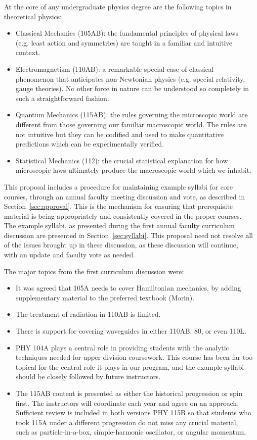 \documentclass[12pt]{article}
\begin{document}
At the core of any undergraduate physics degree are the following
topics in theoretical physics:
\begin{itemize}
\item Classical Mechanics (105AB): the fundamental principles of physical laws
  (e.g. least action and symmetries) are taught in a familiar and
  intuitive context. 
\item Electromagnetism (110AB): a remarkable special case of classical
  phenomenon that anticipates non-Newtonian physics (e.g. special
  relativity, gauge theories).  No other force in nature can be understood so
  completely in such a straightforward fashion.  
\item Quantum Mechanics (115AB): the rules governing the microscopic world are
  different from those governing our familiar macroscopic world.  The
  rules are not intuitive but they can be codified and used to make
  quantitative predictions which can be experimentally verified.
\item Statistical Mechanics (112): the crucial statistical explanation for how
  microscopic laws ultimately produce the macroscopic world which we inhabit.
\end{itemize}

This proposal includes a procedure for maintaining example syllabi for
core courses, through an annual faculty meeting discussion and vote,
as described in Section~\ref{sec:approval}.  This is the mechanism for
ensuring that prerequisite material is being appropriately and
consistently covered in the proper courses.  The example syllabi, as
presented during the first annual faculty curriculum discussion are
presented in Section~\ref{sec:syllabi}.  This proposal need not
resolve all of the issues brought up in these discussion, as these
discussion will continue, with an update and faculty vote as
needed.

The major topics from the first curriculum discussion were:
\begin{itemize}
 \item It was agreed that 105A needs to cover Hamiltonian mechanics, by
   adding supplementary material to the preferred textbook (Morin).
 \item The treatment of radiation in 110AB is limited.
 \item There is support for covering waveguides in either 110AB, 80, or even 110L.   
 \item PHY 104A plays a central role in providing students with the
   analytic techniques needed for upper division coursework.  This
   course has been far too topical for the central role it plays in
   our program, and the example syllabi should be closely followed by
   future instructors.
 \item The 115AB content is presented as either the historical
   progression or spin first.  The instructors will coordinate each
   year and agree on an approach.  Sufficient review is included in
   both versions PHY 115B so that students who took 115A under a
   different progression do not miss any crucial material, such as
   particle-in-a-box, simple-harmonic oscillator, or angular momentum.

   
\end{itemize}
\end{document}
